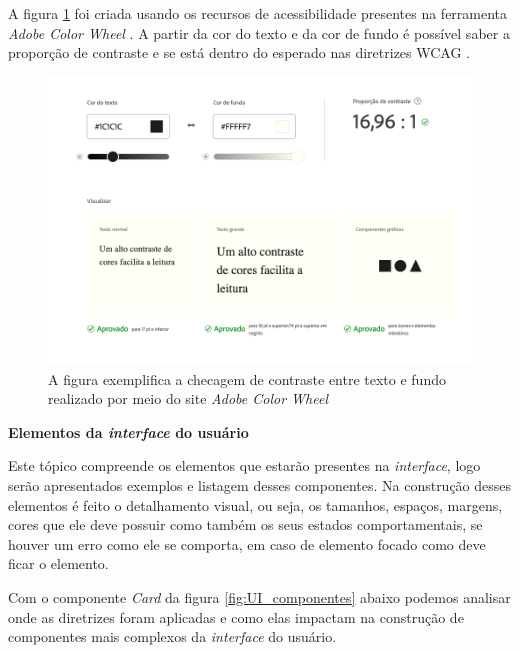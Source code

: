 {A figura \ref{fig3:tipografia} foi criada usando os recursos de acessibilidade presentes na ferramenta \textit{Adobe Color Wheel} \cite{ADOBE}. A partir da cor do texto e da cor de fundo é possível saber a proporção de contraste e se está dentro do esperado nas diretrizes WCAG \cite{WCAG20}.

\begin{figure}[ht]
    \centering
	\includegraphics[width=1.0\textwidth]{images/contrast_check.png}
    \caption{A figura exemplifica a checagem de contraste entre texto e fundo realizado por meio do site  \textit{Adobe Color Wheel} \cite{ADOBE}}
    \label{fig3:tipografia}
\end{figure} 

\newpage
{\centerline{\textbf{Elementos da \textit{interface} do usuário}}}
Este tópico compreende os elementos que estarão presentes na \textit{interface}, logo serão apresentados exemplos e listagem desses componentes. Na construção desses elementos é feito o detalhamento visual, ou seja, os tamanhos, espaços, margens, cores que ele deve possuir como também os seus estados comportamentais, se houver um erro como ele se comporta, em caso de elemento focado como deve ficar o elemento.

Com o componente \textit{Card} da figura \ref{fig:UI_componentes} abaixo podemos analisar onde as diretrizes foram aplicadas e como elas impactam na construção de componentes mais complexos da \textit{interface} do usuário.  

}
